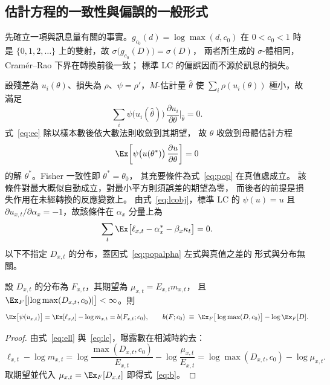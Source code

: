 \subsection{估計方程的一致性與偏誤的一般形式}\label{subsec:consistency}\label{subsec:mixrep}

先確立一項與訊息量有關的事實。$g_{c_0}(d)=\log\max(d,c_0)$ 在 $0<c_0<1$ 時是
$\{0,1,2,\dots\}$ 上的雙射，故 $\sigma\bigl(g_{c_0}(D)\bigr)=\sigma(D)$，
兩者所生成的 $\sigma$-體相同，Cramér--Rao 下界在轉換前後一致；
標準 LC 的偏誤因而不源於訊息的損失。

設殘差為 $u_i(\theta)$、損失為 $\rho$、$\psi=\rho'$，$M$-估計量 $\hat\theta$
使 $\sum_i\rho(u_i(\theta))$ 極小，故滿足
\begin{equation}\label{eq:ee}
\sum_i \psi\big(u_i(\hat\theta)\big)\,
\frac{\partial u_i}{\partial\theta}\Big|_{\hat\theta}=0 .
\end{equation}
式~\eqref{eq:ee} 除以樣本數後依大數法則收斂到其期望，
故 $\hat\theta$ 收斂到母體估計方程
\begin{equation}\label{eq:pop}
\Ex\!\left[\psi\big(u(\theta^{\ast})\big)\,
\frac{\partial u}{\partial\theta}\right]=0
\end{equation}
的解 $\theta^{\ast}$。Fisher 一致性即 $\theta^{\ast}=\theta_0$，
其充要條件為式~\eqref{eq:pop} 在真值處成立。
該條件對最大概似自動成立，對最小平方則須誤差的期望為零，
而後者的前提是損失作用在未經轉換的反應變數上。
由式~\eqref{eq:lcobj}，標準 LC 的 $\psi(u)=u$ 且
$\partial u_{x,t}/\partial\alpha_x=-1$，故該條件在 $\alpha_x$ 分量上為
\begin{equation}\label{eq:popalpha}
\sum_{t}\Ex\big[\ell_{x,t}-\alpha_x^{\ast}-\beta_x\kappa_t\big]=0 .
\end{equation}
以下不指定 $D_{x,t}$ 的分布，蓋因式~\eqref{eq:popalpha} 左式與真值之差的
形式與分布無關。

\begin{prop}\label{prop:fisher}
設 $D_{x,t}$ 的分布為 $F_{x,t}$，其期望為 $\mu_{x,t}=E_{x,t}m_{x,t}$，
且 $\Ex_{F}\bigl[\lvert\log\max(D_{x,t},c_0)\rvert\bigr]<\infty$。則
\begin{equation}\label{eq:b}
\Ex\big[\psi(u_{x,t})\big]=\Ex[\ell_{x,t}]-\log m_{x,t}=b(F_{x,t};c_0),
\qquad
b(F;c_0)\;\equiv\;\Ex_{F}\big[\log\max(D,c_0)\big]-\log\Ex_{F}[D] .
\end{equation}
\end{prop}

\begin{proof}
由式~\eqref{eq:ell} 與~\eqref{eq:lc}，曝露數在相減時約去：
\begin{equation}\label{eq:pf1}
\ell_{x,t}-\log m_{x,t}
=\log\frac{\max(D_{x,t},c_0)}{E_{x,t}}-\log\frac{\mu_{x,t}}{E_{x,t}}
=\log\max(D_{x,t},c_0)-\log\mu_{x,t} .
\end{equation}
取期望並代入 $\mu_{x,t}=\Ex_{F}[D_{x,t}]$ 即得式~\eqref{eq:b}。
\end{proof}

